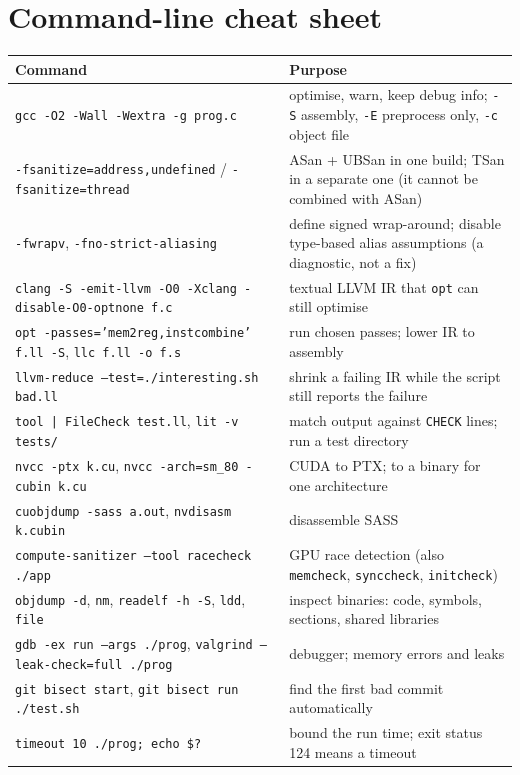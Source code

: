 \documentclass[10pt,a4paper,openany,oneside]{report}
\begin{document}
\section{Command-line cheat sheet}
\begin{center}\small
\begin{xltabular}{\textwidth}{@{}L{6.0cm}Y@{}}
\toprule
\textbf{Command} & \textbf{Purpose}\\
\midrule\endhead
\texttt{gcc -O2 -Wall -Wextra -g prog.c} & optimise, warn, keep debug info; \texttt{-S} assembly, \texttt{-E} preprocess only, \texttt{-c} object file\\
\texttt{-fsanitize=address,undefined} / \texttt{-fsanitize=thread} & ASan + UBSan in one build; TSan in a separate one (it cannot be combined with ASan)\\
\texttt{-fwrapv}, \texttt{-fno-strict-aliasing} & define signed wrap-around; disable type-based alias assumptions (a diagnostic, not a fix)\\
\texttt{clang -S -emit-llvm -O0 -Xclang -disable-O0-optnone f.c} & textual LLVM IR that \texttt{opt} can still optimise\\
\texttt{opt -passes='mem2reg,instcombine' f.ll -S}, \texttt{llc f.ll -o f.s} & run chosen passes; lower IR to assembly\\
\texttt{llvm-reduce --test=./interesting.sh bad.ll} & shrink a failing IR while the script still reports the failure\\
\texttt{tool | FileCheck test.ll}, \texttt{lit -v tests/} & match output against \texttt{CHECK} lines; run a test directory\\
\texttt{nvcc -ptx k.cu}, \texttt{nvcc -arch=sm\_80 -cubin k.cu} & CUDA to PTX; to a binary for one architecture\\
\texttt{cuobjdump -sass a.out}, \texttt{nvdisasm k.cubin} & disassemble SASS\\
\texttt{compute-sanitizer --tool racecheck ./app} & GPU race detection (also \texttt{memcheck}, \texttt{synccheck}, \texttt{initcheck})\\
\texttt{objdump -d}, \texttt{nm}, \texttt{readelf -h -S}, \texttt{ldd}, \texttt{file} & inspect binaries: code, symbols, sections, shared libraries\\
\texttt{gdb -ex run --args ./prog}, \texttt{valgrind --leak-check=full ./prog} & debugger; memory errors and leaks\\
\texttt{git bisect start}, \texttt{git bisect run ./test.sh} & find the first bad commit automatically\\
\texttt{timeout 10 ./prog; echo \$?} & bound the run time; exit status 124 means a timeout\\
\bottomrule
\end{xltabular}
\end{center}
\end{document}
